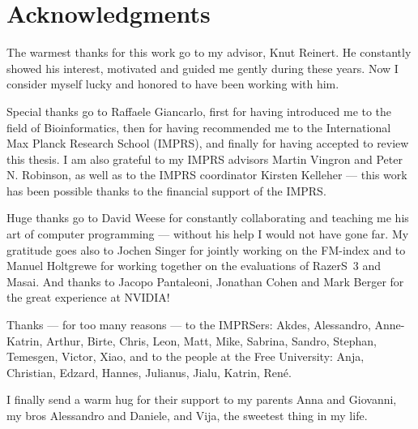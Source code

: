 \section*{Acknowledgments}
\label{sec::acknowlegments}

The warmest thanks for this work go to my advisor, Knut Reinert.
He constantly showed his interest, motivated and guided me gently during these years.
Now I consider myself lucky and honored to have been working with him.

Special thanks go to Raffaele Giancarlo, first for having introduced me to the field of Bioinformatics, then for having recommended me to the International Max Planck Research School (IMPRS), and finally for having accepted to review this thesis.
I am also grateful to my IMPRS advisors Martin Vingron and Peter N. Robinson, as well as to the IMPRS coordinator Kirsten Kelleher ---
this work has been possible thanks to the financial support of the IMPRS.

Huge thanks go to David Weese for constantly collaborating and teaching me his art of computer programming --- without his help I would not have gone far.
My gratitude goes also to Jochen Singer for jointly working on the FM-index and to Manuel Holtgrewe for working together on the evaluations of RazerS~3 and Masai.
And thanks to Jacopo Pantaleoni, Jonathan Cohen and Mark Berger for the great experience at NVIDIA!

Thanks --- for too many reasons --- to the IMPRSers: Akdes, Alessandro, Anne-Katrin, Arthur, Birte, Chris, Leon, Matt, Mike, Sabrina, Sandro, Stephan, Temesgen, Victor, Xiao, 
and to the people at the Free University: Anja, Christian, Edzard, Hannes, Julianus, Jialu, Katrin, Ren\'e.

I finally send a warm hug for their support to my parents Anna and Giovanni, my bros Alessandro and Daniele, and Vija, the sweetest thing in my life.

